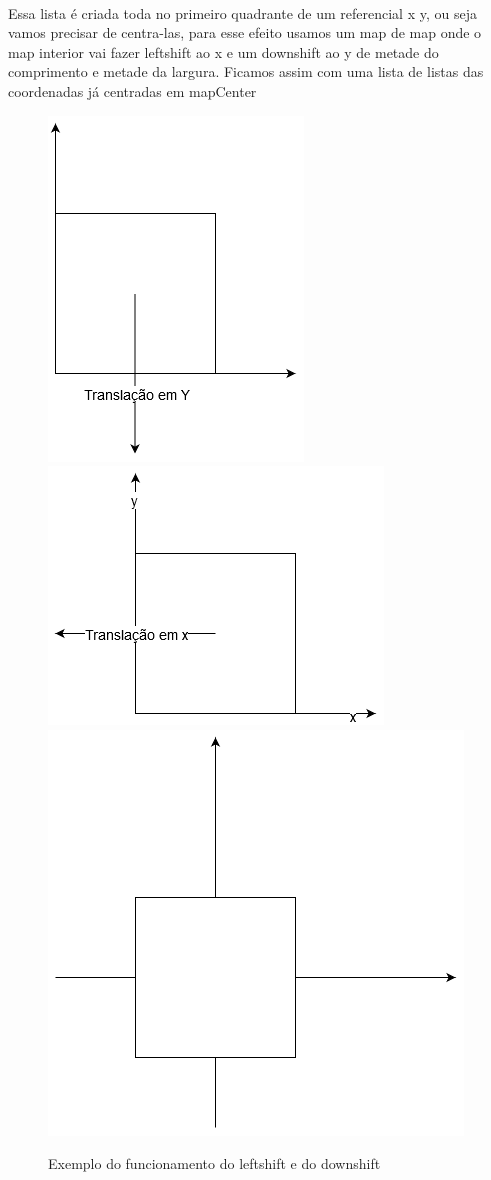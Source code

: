 \documentclass[a4paper]{article}
\begin{document}
\\
Essa lista é criada toda no primeiro quadrante de um referencial x y, ou seja vamos precisar de centra-las, para esse efeito
usamos um map de map onde o map interior vai fazer leftshift ao x e um downshift ao y de metade do comprimento e metade da largura.
Ficamos assim com uma lista de listas das coordenadas já centradas em mapCenter
\\
\begin{figure}[H]\centering
\includegraphics[scale=0.4]{images/translacaoy5.png}
\includegraphics[scale=0.4]{images/translacaox5.png}
\includegraphics[scale=0.3]{images/coordenadasfinal5.png}
\caption{Exemplo do funcionamento do leftshift e do downshift}
\end{figure}
\\
\end{document}
